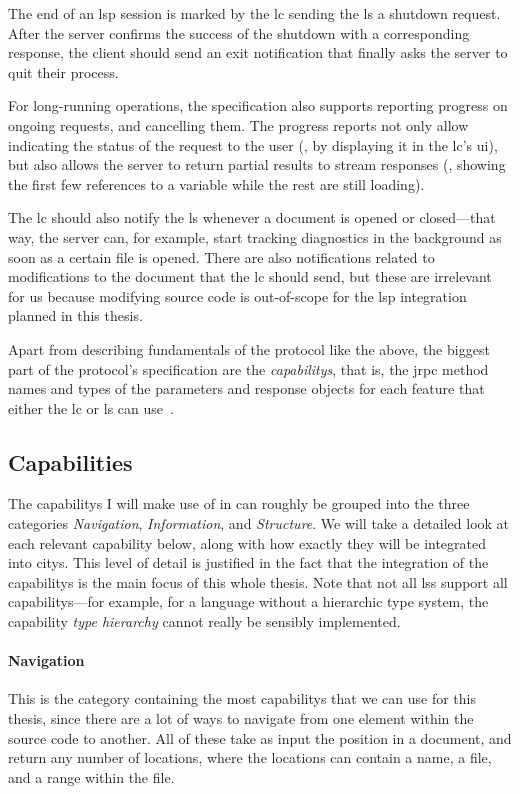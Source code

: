 \documentclass[../thesis]{subfiles}
\begin{document}
The end of an \gls{lsp} session is marked by the \gls{lc} sending the \gls{ls} a shutdown request.
After the server confirms the success of the shutdown with a corresponding response, the client should send an exit notification that finally asks the server to quit their process.

For long-running operations, the specification also supports reporting progress on ongoing requests, and cancelling them.
The progress reports not only allow indicating the status of the request to the user (\eg, by displaying it in the \gls{lc}'s \gls{ui}), but also allows the server to return partial results to stream responses (\eg, showing the first few references to a variable while the rest are still loading).

The \gls{lc} should also notify the \gls{ls} whenever a document is opened or closed---that way, the server can, for example, start tracking diagnostics in the background as soon as a certain file is opened.
There are also notifications related to modifications to the document that the \gls{lc} should send, but these are irrelevant for us because modifying source code is out-of-scope for the \gls{lsp} integration planned in this thesis.

Apart from describing fundamentals of the protocol like the above, the biggest part of the protocol's specification are the \emph{\glspl{capability}}, that is, the \gls{jrpc} method names and types of the parameters and response objects for each feature that either the \gls{lc} or \gls{ls} can use~\cite{lsp}.

\subsection{Capabilities}\label{subsec:capabilities}
The \glspl{capability} I will make use of in \SEE{} can roughly be grouped into the three categories \emph{Navigation}, \emph{Information}, and \emph{Structure}.
We will take a detailed look at each relevant \gls{capability} below, along with how exactly they will be integrated into \glspl{city}.
This level of detail is justified in the fact that the integration of the \glspl{capability} is the main focus of this whole thesis.
Note that not all \glspl{ls} support all \glspl{capability}---for example, for a language without a hierarchic type system, the \gls{capability} \emph{type hierarchy} cannot really be sensibly implemented.

\paragraph{Navigation}
This is the category containing the most \glspl{capability} that we can use for this thesis, since there are a lot of ways to navigate from one element within the source code to another.
All of these take as input the position in a document, and return any number of locations, where the locations can contain a name, a file, and a \gls{range} within the file.
\end{document}

